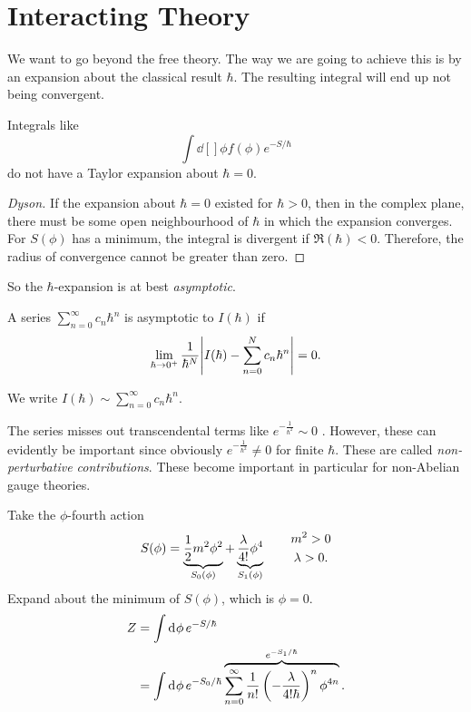 
\section{Interacting Theory}%
\label{sec:interacting_theory}

We want to go beyond the free theory.
The way we are going to achieve this is by an expansion about the classical result $\hbar$.
The resulting integral will end up not being convergent.

\begin{claim}
  Integrals like
  \begin{equation}
    \int \dd[]{\phi} f(\phi) e^{- S / \hbar}
  \end{equation}
  do not have a Taylor expansion about $\hbar = 0$.
\end{claim}
\begin{proof}[Dyson]
  If the expansion about $\hbar = 0$ existed for $\hbar > 0$, then in the complex plane, there must be some open neighbourhood of $\hbar$ in which the expansion converges.
  For $S(\phi)$ has a minimum, the integral is divergent if $\Re (\hbar)< 0$.
  Therefore, the radius of convergence cannot be greater than zero.
\end{proof}

So the $\hbar$-expansion is at best \emph{asymptotic}.
\begin{definition}[asymptotic]
  A series $\sum_{n = 0}^{\infty} c_n \hbar^n$  is asymptotic to $I(\hbar)$ if
  \begin{equation}
    \lim_{\hbar \to 0^+} \frac{1}{\hbar^N} \abs{I(\hbar) - \sum_{n=0}^N c_n \hbar^n} = 0.
  \end{equation} 
\end{definition}
\begin{notation}[]
  We write $I(\hbar) \sim \sum_{n=0}^{\infty} c_n \hbar^n$.
\end{notation}

The series misses out transcendental terms like $e^{-\frac{1}{\hbar^2}} \sim 0$ . However, these can evidently be important since obviously $e^{-\frac{1}{\hbar^2}} \neq 0$  for finite $\hbar$. These are called  \emph{non-perturbative contributions}. These become important in particular for non-Abelian gauge theories.

Take the $\phi$-fourth action
\begin{equation}
  S(\phi) = \underbrace{\frac{1}{2} m^2 \phi^2}_{\mathclap{S_0(\phi)}} + \underbrace{\frac{\lambda}{4!} \phi^4}_{\mathclap{S_1(\phi)}} \qquad 
  \begin{gathered}
    m^2 > 0 \\
    \lambda > 0.
  \end{gathered}
\end{equation}
Expand about the minimum of $S(\phi)$, which is $\phi = 0$.
\begin{align}
  Z &= \int \dd[]{\phi} e^{- S / \hbar}  \\
    &= \int \dd[]{\phi} e^{-S_0 / \hbar} \overbrace{\sum_{n=0}^\infty \frac{1}{n!} \left( -\frac{\lambda}{4! \hbar} \right)^n \phi^{4 n}}^{\mathclap{e^{- S_1 / \hbar}}}.
\end{align}

